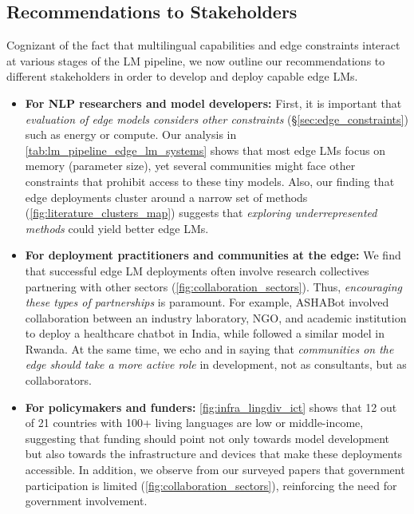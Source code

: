 \documentclass[11pt,a4paper]{article}
\begin{document}
\subsection{Recommendations to Stakeholders}

Cognizant of the fact that multilingual capabilities and edge constraints interact at various stages of the LM pipeline,
we now outline our recommendations to different stakeholders in order to develop and deploy capable edge LMs.

\begin{itemize}[leftmargin=5mm,itemsep=0mm]
  \item \textbf{For NLP researchers and model developers:}
        First, it is important that \textit{evaluation of edge models considers other constraints} (\S\ref{sec:edge_constraints}) such as energy or compute.
        Our analysis in \autoref{tab:lm_pipeline_edge_lm_systems} shows that most edge LMs focus on memory (parameter size), yet several communities might face other constraints that prohibit access to these tiny models.
        Also, our finding that edge deployments cluster around a narrow set of methods (\autoref{fig:literature_clusters_map}) suggests that
        \textit{exploring underrepresented methods} could yield better edge LMs.
  \item \textbf{For deployment practitioners and communities at the edge:}
        We find that successful edge LM deployments often involve research collectives partnering with other sectors (\autoref{fig:collaboration_sectors}).
        Thus, \textit{encouraging these types of partnerships} is paramount.
        For example, ASHABot \citep{ramjee-etal-2025-ashabot} involved collaboration between an industry laboratory, NGO, and academic institution to deploy a healthcare chatbot in India, while \citet{rutunda-etal-2026-large} followed a similar model in Rwanda.
        At the same time, we echo \citet{pillai-etal-2023-community} and \citet{petti2025coact} in saying that \textit{communities on the edge should take a more active role} in development,
        not as consultants, but as collaborators.
  \item \textbf{For policymakers and funders:}
        \autoref{fig:infra_lingdiv_ict} shows that 12 out of 21 countries with 100+ living languages are low or middle-income, suggesting that funding should point not only towards model development but also towards the infrastructure and devices that make these deployments accessible.
        In addition, we observe from our surveyed papers that government participation is limited (\autoref{fig:collaboration_sectors}), reinforcing the need for government involvement.
\end{itemize}
\end{document}
